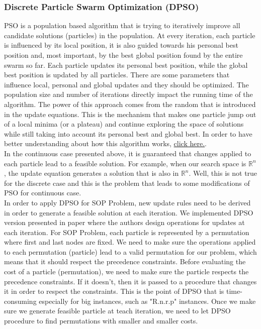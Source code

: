 \documentclass[]{article}
\begin{document}
    \subsubsection{Discrete Particle Swarm Optimization (DPSO)}
    
    PSO is a population based algorithm that is trying to iteratively improve all candidate solutions (particles) in the population. At every 
    iteration, each particle is influenced by its local position, it is also guided towards his personal best position and, most important, by the 
    best global position found by the entire swarm so far. Each particle updates its personal best position, while the global best position is 
    updated by all particles. There are some parameters that influence local, personal and global updates and they should be optimized. The 
    population size and number of iterations directly impact the running time of the algorithm. The power of this approach comes from the random 
    that is introduced in the update equations. This is the mechanism that makes one particle jump out of a local minima (or a plateau) and continue 
    exploring the space of solutions while still taking into account its personal best and global best. In order to have better understanding about 
    how this algorithm works, \href{https://upload.wikimedia.org/wikipedia/commons/e/ec/ParticleSwarmArrowsAnimation.gif}{click here.}.\\
    
	In the continuous case presented above, it is guaranteed that changes applied to each particle lead to a feasible solution. For 
	example, when our search space is $ \mathbb{R}^n $, the update equation generates a solution that is also in $ \mathbb{R}^n $. Well, this is not 
	true for the discrete case and this is the problem that leads to some modifications of PSO for continuous case.\\
	
	In order to apply DPSO for SOP Problem, new update rules need to be derived in order to generate a feasible solution at each iteration. We 
	implemented DPSO version presented in paper \cite{DPSO-paper} where the authors design operations for updates at each iteration. For SOP Problem, 
	each particle is represented by a permutation where first and last nodes are fixed. We need to make sure the operations applied to each 
	permutation (particle) lead to a valid permutation for our problem, which means that it should respect the precedence constraints. Before 
	evaluating the cost of a particle (permutation), we need to make sure the particle respects the precedence constraints. If it doesn't, then it is 
	passed to a procedure that changes it in order to respect the constraints. This is the point of DPSO that is time-consuming especially for big 
	instances, such as "R.n.r.p" instances. Once we make sure we generate feasible particle at teach iteration, we need to let DPSO procedure to find 
	permutations with smaller and smaller costs. \\
	
\end{document}
